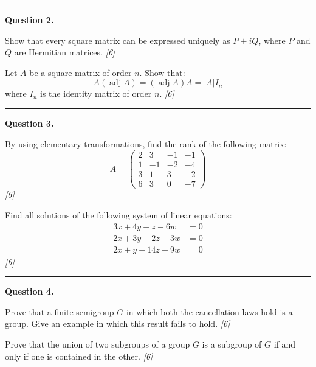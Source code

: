 \documentclass[11pt,a4paper]{article}
\newcommand{\pts}[1]{\hfill   \textit{[#1]}}
\begin{document}
\medskip\rule{\linewidth}{0.2pt}

\medskip


\noindent   \textbf{Question 2.}

\begin{parts}
  \item Show that every square matrix can be expressed uniquely as $P + iQ$, where $P$ and $Q$ are Hermitian matrices. \pts{6}
  \item Let $A$ be a square matrix of order $n$. Show that:
  \[ A(\operatorname{adj} A) = (\operatorname{adj} A)A = |A|I_n \]
  where $I_n$ is the identity matrix of order $n$. \pts{6}
\end{parts}

\medskip\rule{\linewidth}{0.2pt}

\medskip


\noindent   \textbf{Question 3.}

\begin{parts}
  \item By using elementary transformations, find the rank of the following matrix:
  \[ A = 
\begin{pmatrix} 2 & 3 & -1 & -1 \\ 1 & -1 & -2 & -4 \\ 3 & 1 & 3 & -2 \\ 6 & 3 & 0 & -7 \end{pmatrix} \] \pts{6}
  \item Find all solutions of the following system of linear equations:
  \[ 
\begin{aligned}
    3x + 4y - z - 6w &= 0 \\
    2x + 3y + 2z - 3w &= 0 \\
    2x + y - 14z - 9w &= 0
  \end{aligned} \] \pts{6}
\end{parts}

\medskip\rule{\linewidth}{0.2pt}

\medskip


\noindent   \textbf{Question 4.}

\begin{parts}
  \item Prove that a finite semigroup $G$ in which both the cancellation laws hold is a group. Give an example in which this result fails to hold. \pts{6}
  \item Prove that the union of two subgroups of a group $G$ is a subgroup of $G$ if and only if one is contained in the other. \pts{6}
\end{parts}
\end{document}
